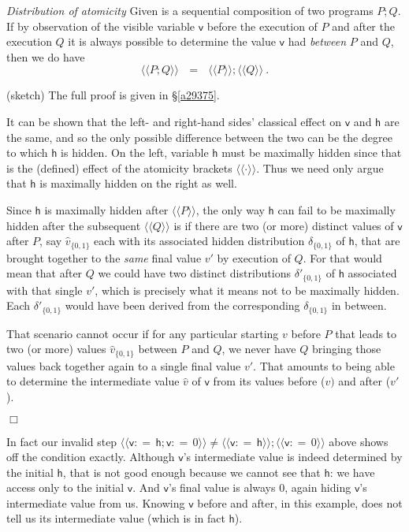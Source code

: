 \documentclass[runningheads]{llncs}
\newcommand\Vh {\mathsf{h}}
\newcommand\Vv {\mathsf{v}}
\newcommand\App[1] {App.~\ref{#1}}
\renewcommand\App[1] {\S\ref{#1}}
\newcommand\Atomic[1] {\AtomicOpen#1\AtomicClose}
\newcommand\AtomicOpen {\langle\!\langle}
\newcommand\AtomicClose {\rangle\!\rangle}
\newcommand\Gets {{:}{=}\,}
\newcommand\Wide[1] {~~~#1~~~}
\newenvironment{Lemma}[2]{\begin{lemma}\label{#2}\textit{#1}\rm\quad}{\hfill$\Box$\end{lemma}}
\begin{document}
\begin{Lemma}{Distribution of atomicity}{l1222}
Given is a sequential composition of two programs $P;Q$. If by observation of the visible variable $\Vv$ before the execution of $P$ and after the execution $Q$ it is always possible to determine the value $\Vv$ had \emph{between} $P$ and $Q$, then we do have
\[
 \Atomic{P;Q} \Wide{=} \Atomic{P}; \Atomic{Q} ~.
\]
\begin{Proof} 
(sketch) The full proof is given in \App{a29375}.

It can be shown that the left- and right-hand sides' classical effect on $\Vv$ and $\Vh$ are the same, and so the only possible difference between the two can be the degree to which $\Vh$ is hidden. On the left, variable $\Vh$ must be maximally hidden since that is the (defined) effect of the atomicity brackets $\Atomic{\cdot}$. Thus we need only argue that $\Vh$ is maximally hidden on the right as well.

Since $\Vh$ is maximally hidden after $\Atomic{P}$, the only way $\Vh$ can fail to be maximally hidden after the subsequent $\Atomic{Q}$ is if there are two (or more) distinct values of $\Vv$ after $P$, say $\hat{v}_{{\{0,1\}}}$ each with its associated hidden distribution $\delta_{\{0,1\}}$ of $\Vh$, that are brought together to the \emph{same} final value $v'$ by execution of $Q$. For that would mean that after $Q$ we could have two distinct distributions $\delta'_{\{0,1\}}$ of $\Vh$ associated with that single $v'$, which is precisely what it means not to be maximally hidden. Each $\delta'_{\{0,1\}}$ would have been derived from the corresponding $\delta_{\{0,1\}}$ in between.

That scenario cannot occur if for any particular starting $v$ before $P$ that leads to two (or more) values $\hat{v}_{\{0,1\}}$ between $P$ and $Q$, we never have $Q$ bringing those values back together again to a single final value $v'$. That amounts to being able to determine the intermediate value $\hat{v}$ of $\Vv$ from its values before ($v)$  and after ($v'$).
\end{Proof}
\end{Lemma}

In fact our invalid step $\Atomic{\Vv\Gets \Vh;\Vv\Gets0}\neq\Atomic{\Vv\Gets \Vh};\Atomic{\Vv\Gets0}$ above shows off the condition exactly. Although $\Vv$'s intermediate value is indeed determined by the initial $\Vh$, that is not good enough because we cannot see that $\Vh$: we have access only to the initial $\Vv$. And $\Vv$'s final value is always 0, again hiding $\Vv$'s intermediate value from us. Knowing $\Vv$ before and after, in this example, does not tell us its intermediate value (which is in fact $\Vh$).\,
\end{document}
